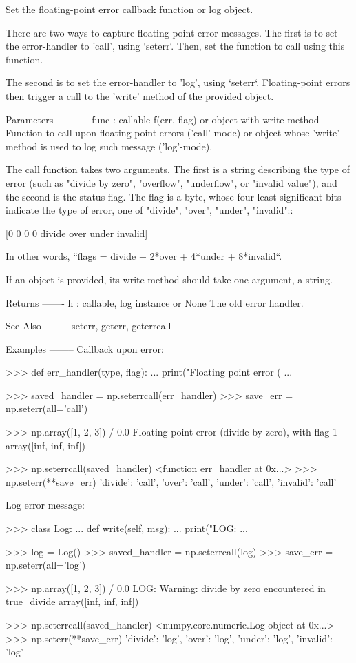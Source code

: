 \begin{DoxyVerb}Set the floating-point error callback function or log object.

There are two ways to capture floating-point error messages.  The first
is to set the error-handler to 'call', using `seterr`.  Then, set
the function to call using this function.

The second is to set the error-handler to 'log', using `seterr`.
Floating-point errors then trigger a call to the 'write' method of
the provided object.

Parameters
----------
func : callable f(err, flag) or object with write method
    Function to call upon floating-point errors ('call'-mode) or
    object whose 'write' method is used to log such message ('log'-mode).

    The call function takes two arguments. The first is a string describing
    the type of error (such as "divide by zero", "overflow", "underflow",
    or "invalid value"), and the second is the status flag.  The flag is a
    byte, whose four least-significant bits indicate the type of error, one
    of "divide", "over", "under", "invalid"::

      [0 0 0 0 divide over under invalid]

    In other words, ``flags = divide + 2*over + 4*under + 8*invalid``.

    If an object is provided, its write method should take one argument,
    a string.

Returns
-------
h : callable, log instance or None
    The old error handler.

See Also
--------
seterr, geterr, geterrcall

Examples
--------
Callback upon error:

>>> def err_handler(type, flag):
...     print("Floating point error (%
...

>>> saved_handler = np.seterrcall(err_handler)
>>> save_err = np.seterr(all='call')

>>> np.array([1, 2, 3]) / 0.0
Floating point error (divide by zero), with flag 1
array([inf, inf, inf])

>>> np.seterrcall(saved_handler)
<function err_handler at 0x...>
>>> np.seterr(**save_err)
{'divide': 'call', 'over': 'call', 'under': 'call', 'invalid': 'call'}

Log error message:

>>> class Log:
...     def write(self, msg):
...         print("LOG: %
...

>>> log = Log()
>>> saved_handler = np.seterrcall(log)
>>> save_err = np.seterr(all='log')

>>> np.array([1, 2, 3]) / 0.0
LOG: Warning: divide by zero encountered in true_divide
array([inf, inf, inf])

>>> np.seterrcall(saved_handler)
<numpy.core.numeric.Log object at 0x...>
>>> np.seterr(**save_err)
{'divide': 'log', 'over': 'log', 'under': 'log', 'invalid': 'log'}\end{DoxyVerb}
 